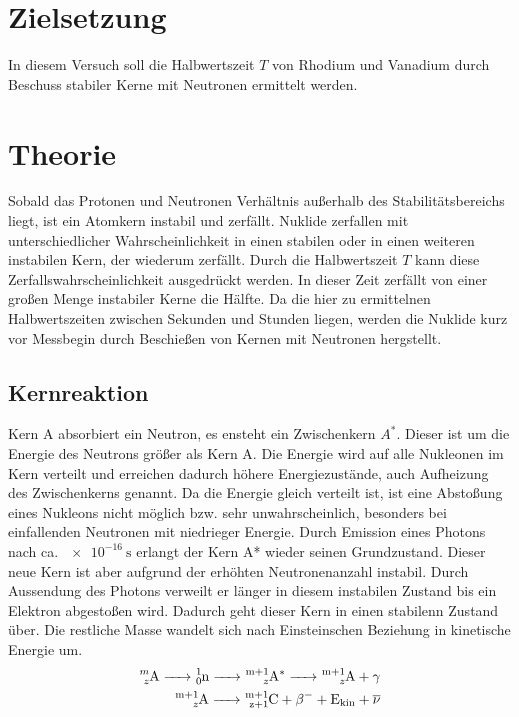\section{Zielsetzung}
In diesem Versuch soll die Halbwertszeit $T$ von Rhodium und Vanadium durch Beschuss stabiler Kerne mit Neutronen ermittelt werden.

\section{Theorie}
\label{sec:Theorie}
Sobald das Protonen und Neutronen Verhältnis außerhalb des Stabilitätsbereichs liegt, ist ein Atomkern instabil und zerfällt.
Nuklide zerfallen mit unterschiedlicher Wahrscheinlichkeit in einen stabilen oder in einen weiteren instabilen Kern, der wiederum zerfällt.
Durch die Halbwertszeit $T$ kann diese Zerfallswahrscheinlichkeit ausgedrückt werden.
In dieser Zeit zerfällt von einer großen Menge instabiler Kerne die Hälfte.
Da die hier zu ermittelnen Halbwertszeiten zwischen Sekunden und Stunden liegen, werden die Nuklide kurz vor Messbegin durch Beschießen von Kernen mit Neutronen hergstellt.

\subsection{Kernreaktion}
\label{subsec:Kernreaktion}
Kern A absorbiert ein Neutron, es ensteht ein Zwischenkern $A^*$.
Dieser ist um die Energie des Neutrons größer als Kern A.
Die Energie wird auf alle Nukleonen im Kern verteilt und erreichen dadurch höhere Energiezustände, auch Aufheizung des Zwischenkerns genannt.
Da die Energie gleich verteilt ist, ist eine Abstoßung eines Nukleons nicht möglich bzw. sehr unwahrscheinlich, besonders bei einfallenden Neutronen mit niedrieger Energie.
Durch Emission eines Photons nach ca. $\SI{e-16}{\second}$ erlangt der Kern A* wieder seinen Grundzustand.
Dieser neue Kern ist aber aufgrund der erhöhten Neutronenanzahl instabil.
Durch Aussendung des Photons verweilt er länger in diesem instabilen Zustand bis ein Elektron abgestoßen wird.
Dadurch geht dieser Kern in einen stabilenn Zustand über.
Die restliche Masse wandelt sich nach Einsteinschen Beziehung in kinetische Energie um.
\begin{align*}
    \ce{^{m}_{z}A -> ^{1}_0n -> ^{m{+1}}_{z}{A^{*}} -> ^{m{+1}}_{z}A + \gamma}\\
    \ce{^{m{+1}}_{z}A -> ^{m{+1}}_{z{+1}}C + \beta ^{-} + E_{\text{kin}} + \overline{\nu}}
\end{align*}
